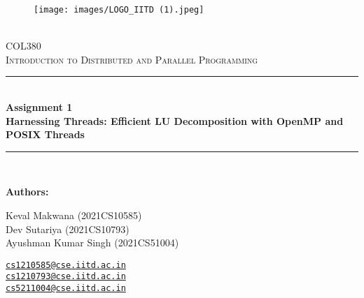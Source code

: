\documentclass[12pt]{article}
\newcommand{\HRule}{\rule{\linewidth}{0.5mm}} %
\begin{document}
\begin{center}
    \begin{figure}
        \vspace{0.0cm}
        \texttt{[image: images/LOGO\_IITD (1).jpeg]} %
    \end{figure}
    \mbox{}\\[2.0cm]
    \vspace{-2.0cm}
    \textsc{\Huge COL380}\\[2.5cm]
    \textsc{\LARGE Introduction to Distributed and Parallel Programming}\\[2.0cm]
    \HRule\\[0.4cm]
    {\large \bf {\selectfont Assignment 1\\Harnessing Threads: Efficient LU Decomposition with OpenMP and POSIX Threads} 
    }\\[0.2cm]
    \HRule\\[0.5cm]
\end{center}

\begin{flushleft}
    \textbf{\selectfont Authors:}
\end{flushleft}

\begin{center}
    \begin{minipage}{0.5\textwidth}
        \begin{flushleft}
            Keval Makwana (2021CS10585)\\
            Dev Sutariya (2021CS10793) \\
            Ayushman Kumar Singh (2021CS51004)
        \end{flushleft}
    \end{minipage}%
    \begin{minipage}{0.5\textwidth}
        \begin{flushright}
            \href{mailto:cs1210585@cse.iitd.ac.in}{\texttt{cs1210585@cse.iitd.ac.in}}\\
            \href{mailto:cs1210793@cse.iitd.ac.in}
            {\texttt{cs1210793@cse.iitd.ac.in}} \\
            \href{mailto:cs5211004@cse.iitd.ac.in}{\texttt{cs5211004@cse.iitd.ac.in}}
        \end{flushright}
    \end{minipage}
\end{center}
\vspace{0.5 cm}
\end{document}
